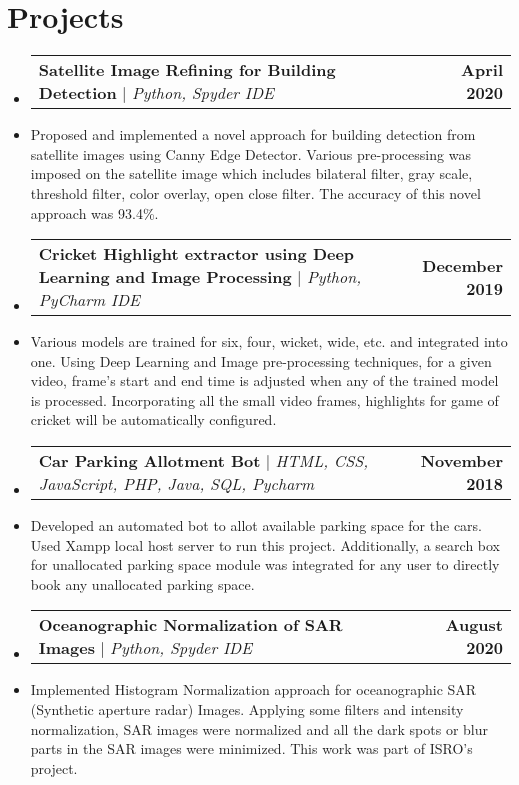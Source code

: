 \documentclass[letterpaper,11pt]{article}
\makeatletter
\newcommand{\resumeProjectHeading}[2]{
    \item
    \begin{tabular*}{1.001\textwidth}{l@{\extracolsep{\fill}}r}
      \small#1 & \textbf{\small #2}\\
    \end{tabular*}\vspace{-7pt}
}
\newcommand{\resumeSubHeadingListStart}{\begin{itemize}[leftmargin=0.0in, label={}]}
\newcommand{\resumeSubHeadingListEnd}{\end{itemize}}
\makeatother
\begin{document}
\section{Projects}
    \vspace{-5pt}
    \resumeSubHeadingListStart
      \resumeProjectHeading
          {\textbf{Satellite Image Refining for Building Detection} $|$ \emph{Python, Spyder IDE}}{April 2020}
          \item{Proposed and implemented a novel approach for building detection from satellite images using Canny Edge Detector. Various pre-processing was imposed on the satellite image which includes bilateral filter, gray scale, threshold filter, color overlay, open close filter. The accuracy of this novel approach was 93.4\%.}
          \vspace{-18pt}
      \resumeProjectHeading
          {\textbf{Cricket Highlight extractor using Deep Learning and Image Processing} $|$ \emph{Python, PyCharm IDE}}{December 2019}
          \item{Various models are trained for six, four, wicket, wide, etc. and integrated into one. Using Deep Learning and Image pre-processing techniques, for a given video, frame's start and end time is adjusted when any of the trained model is processed. Incorporating all the small video frames, highlights for game of cricket will be automatically configured.}
          \vspace{-18pt}
          \resumeProjectHeading
          {\textbf{Car Parking Allotment Bot} $|$ \emph{HTML, CSS, JavaScript, PHP, Java,  SQL, Pycharm}}{November 2018}
          \item{
          Developed an automated bot to allot available parking space for the cars. Used Xampp local host server to run this project. Additionally, a search box for unallocated parking space module was integrated for any user to directly book any unallocated parking space.
          }
          \vspace{-18pt}
          \resumeProjectHeading
          {\textbf{Oceanographic Normalization of SAR Images} $|$ \emph{Python, Spyder IDE}}{August 2020}
          \item{Implemented Histogram Normalization approach for oceanographic SAR (Synthetic aperture radar) Images. Applying some filters and intensity normalization, SAR images were normalized and all the dark spots or blur parts in the SAR images were minimized. This work was part of ISRO's project.} 
    \resumeSubHeadingListEnd
\vspace{-18pt}
\end{document}

